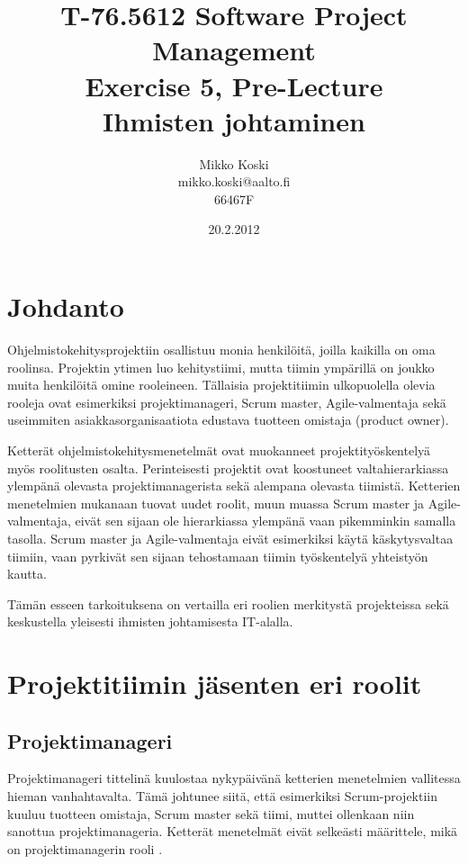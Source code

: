 \documentclass[a4paper]{article}
\begin{document}
\title{\small T-76.5612 Software Project Management \\ Exercise 5, Pre-Lecture \\ \huge Ihmisten johtaminen}
\date{20.2.2012}
\author{Mikko Koski \\ mikko.koski@aalto.fi \\ 66467F}
\maketitle

\normalsize

\section{Johdanto}

Ohjelmistokehitysprojektiin osallistuu monia henkilöitä, joilla kaikilla on oma roolinsa. Projektin ytimen luo kehitystiimi, mutta tiimin ympärillä on joukko muita henkilöitä omine rooleineen. Tällaisia projektitiimin ulkopuolella olevia rooleja ovat esimerkiksi projektimanageri, Scrum master, Agile-valmentaja sekä useimmiten asiakkasorganisaatiota edustava tuotteen omistaja (product owner).

Ketterät ohjelmistokehitysmenetelmät ovat muokanneet projektityöskentelyä myös roolitusten osalta. Perinteisesti projektit ovat koostuneet valtahierarkiassa ylempänä olevasta projektimanagerista sekä alempana olevasta tiimistä. Ketterien menetelmien mukanaan tuovat uudet roolit, muun muassa Scrum master ja Agile-valmentaja, eivät sen sijaan ole hierarkiassa ylempänä vaan pikemminkin samalla tasolla. Scrum master ja Agile-valmentaja eivät esimerkiksi käytä käskytysvaltaa tiimiin, vaan pyrkivät sen sijaan tehostamaan tiimin työskentelyä yhteistyön kautta.

Tämän esseen tarkoituksena on vertailla eri roolien merkitystä projekteissa sekä keskustella yleisesti ihmisten johtamisesta IT-alalla.

\section{Projektitiimin jäsenten eri roolit}

\subsection{Projektimanageri}

Projektimanageri tittelinä kuulostaa nykypäivänä ketterien menetelmien vallitessa hieman vanhahtavalta. Tämä johtunee siitä, että esimerkiksi Scrum-projektiin kuuluu tuotteen omistaja, Scrum master sekä tiimi, muttei ollenkaan niin sanottua projektimanageria. Ketterät menetelmät eivät selkeästi määrittele, mikä on projektimanagerin rooli \citep{augustine2005}.
\end{document}
